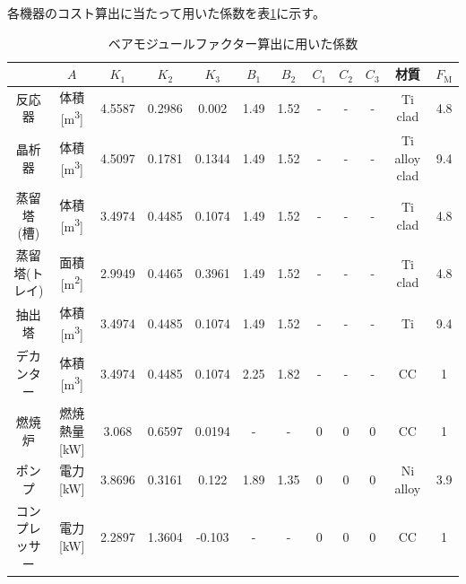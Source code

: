 \documentclass[a4j]{jsreport}
\begin{document}
各機器のコスト算出に当たって用いた係数を表\ref{BM係数}に示す。
\begin{table}[h]
    \caption{ベアモジュールファクター算出に用いた係数}
    \label{BM係数}
    \begin{tabular}{cccccccccccc}\hline
    &$A$ & $K_1$     & $K_2$     & $K_3$     & $B_1$   & $B_2$   &$C_1$&$C_2$&$C_3$& 材質 & $F_\mathrm{M}$  \\\hline
    反応器  & 体積[\si{\cubic\metre}]  & 4.5587 & 0.2986 & 0.002  & 1.49 & 1.52 &-&-&-& Ti clad       & 4.8 \\
    晶析器   & 体積[\si{\cubic\metre}] & 4.5097 & 0.1781 & 0.1344 & 1.49 & 1.52 &-&-&-& Ti alloy clad & 9.4 \\
    蒸留塔(槽)&  体積[\si{\cubic\metre}]   & 3.4974 & 0.4485 & 0.1074 & 1.49 & 1.52 &-&-&-& Ti clad    & 4.8 \\
    蒸留塔(トレイ)& 面積[\si{\square\metre}] & 2.9949 & 0.4465 & 0.3961 & 1.49 & 1.52 &-&-&-& Ti clad   & 4.8 \\
    抽出塔   & 体積[\si{\cubic\metre}] & 3.4974 & 0.4485 & 0.1074 & 1.49 & 1.52 &-&-&-& Ti            & 9.4 \\
    デカンター&  体積[\si{\cubic\metre}] & 3.4974 & 0.4485 & 0.1074 & 2.25 & 1.82 &-&-&-& CC            & 1   \\
    燃焼炉   & 燃焼熱量[\si{\kilo \watt}] & 3.068  & 0.6597 & 0.0194 & -    & -    &0&0&0& CC             & 1   \\
    ポンプ   & 電力[\si{\kilo\watt}] & 3.8696 & 0.3161 & 0.122  & 1.89 & 1.35 &0&0&0& Ni alloy      & 3.9 \\
    コンプレッサー& 電力[\si{\kilo\watt}] & 2.2897 & 1.3604 & -0.103 & -    & -    &0&0&0& CC            & 1  \\\hline
    \end{tabular}
\end{table}
\end{document}
